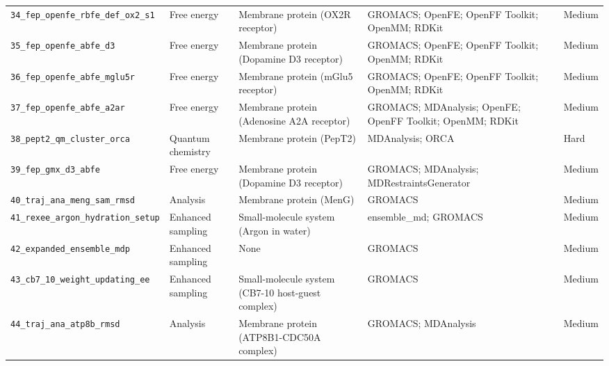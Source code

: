 \documentclass[11pt,a4paper]{article}
\begin{document}
\begin{longtable}{@{}L{0.19\textwidth}L{0.15\textwidth}L{0.29\textwidth}L{0.24\textwidth}L{0.09\textwidth}@{}}
\texttt{34\_\allowbreak{}fep\_\allowbreak{}openfe\_\allowbreak{}rbfe\_\allowbreak{}def\_\allowbreak{}ox2\_\allowbreak{}s1} & Free energy & Membrane protein (OX2R receptor) & GROMACS; \allowbreak{}OpenFE; \allowbreak{}OpenFF Toolkit; \allowbreak{}OpenMM; \allowbreak{}RDKit & Medium \\
\texttt{35\_\allowbreak{}fep\_\allowbreak{}openfe\_\allowbreak{}abfe\_\allowbreak{}d3} & Free energy & Membrane protein (Dopamine D3 receptor) & GROMACS; \allowbreak{}OpenFE; \allowbreak{}OpenFF Toolkit; \allowbreak{}OpenMM; \allowbreak{}RDKit & Medium \\
\texttt{36\_\allowbreak{}fep\_\allowbreak{}openfe\_\allowbreak{}abfe\_\allowbreak{}mglu5r} & Free energy & Membrane protein (mGlu5 receptor) & GROMACS; \allowbreak{}OpenFE; \allowbreak{}OpenFF Toolkit; \allowbreak{}OpenMM; \allowbreak{}RDKit & Medium \\
\texttt{37\_\allowbreak{}fep\_\allowbreak{}openfe\_\allowbreak{}abfe\_\allowbreak{}a2ar} & Free energy & Membrane protein (Adenosine A2A receptor) & GROMACS; \allowbreak{}MDAnalysis; \allowbreak{}OpenFE; \allowbreak{}OpenFF Toolkit; \allowbreak{}OpenMM; \allowbreak{}RDKit & Medium \\
\texttt{38\_\allowbreak{}pept2\_\allowbreak{}qm\_\allowbreak{}cluster\_\allowbreak{}orca} & Quantum chemistry & Membrane protein (PepT2) & MDAnalysis; \allowbreak{}ORCA & Hard \\
\texttt{39\_\allowbreak{}fep\_\allowbreak{}gmx\_\allowbreak{}d3\_\allowbreak{}abfe} & Free energy & Membrane protein (Dopamine D3 receptor) & GROMACS; \allowbreak{}MDAnalysis; \allowbreak{}MDRestraintsGenerator & Medium \\
\texttt{40\_\allowbreak{}traj\_\allowbreak{}ana\_\allowbreak{}meng\_\allowbreak{}sam\_\allowbreak{}rmsd} & Analysis & Membrane protein (MenG) & GROMACS & Medium \\
\texttt{41\_\allowbreak{}rexee\_\allowbreak{}argon\_\allowbreak{}hydration\_\allowbreak{}setup} & Enhanced sampling & Small-molecule system (Argon in water) & ensemble\_md; \allowbreak{}GROMACS & Medium \\
\texttt{42\_\allowbreak{}expanded\_\allowbreak{}ensemble\_\allowbreak{}mdp} & Enhanced sampling & None & GROMACS & Medium \\
\texttt{43\_\allowbreak{}cb7\_\allowbreak{}10\_\allowbreak{}weight\_\allowbreak{}updating\_\allowbreak{}ee} & Enhanced sampling & Small-molecule system (CB7-10 host-guest complex) & GROMACS & Medium \\
\texttt{44\_\allowbreak{}traj\_\allowbreak{}ana\_\allowbreak{}atp8b\_\allowbreak{}rmsd} & Analysis & Membrane protein (ATP8B1-CDC50A complex) & GROMACS; \allowbreak{}MDAnalysis & Medium \\

\end{longtable}
\end{document}
